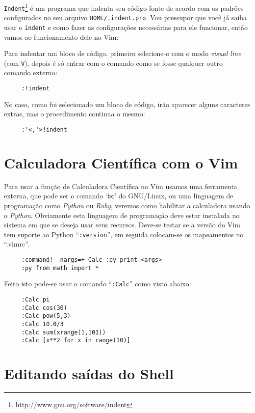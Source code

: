 {\tt Indent}\footnote{http://www.gnu.org/software/indent} 
é um programa que indenta seu código fonte de acordo com os padrões configurados
no seu arquivo {\tt HOME/.indent.pro}. Vou pressupor que você já saiba usar o {\tt indent}
e como fazer as configurações necessárias para ele funcionar, então vamos ao funcionamento 
dele no Vim:

Para indentar um bloco de código, primeiro selecione-o com o modo {\em visual line} (com {\tt V}), 
depois é só entrar com o comando como se fosse qualquer outro comando externo:
\begin{verbatim}
     :!indent
\end{verbatim}

No caso, como foi selecionado um bloco de código, irão aparecer alguns caracteres extras, 
mas o procedimento continua o mesmo:
\begin{verbatim}
     :'<,'>!indent
\end{verbatim}


\section{Calculadora Científica com o Vim}
\label{sec:Calculadora Científica com o Vim}

Para usar a função de Calculadora Científica no Vim usamos uma ferramenta
externa, que pode ser o comando `{\tt bc}' do GNU/Linux, ou uma linguagem de
programação como {\em Python} ou {\em Ruby}, veremos como habilitar a
calculadora usando o {\em Python}. Obviamente esta linguagem de programação
deve estar instalada no sistema em que se deseja usar seus recursos.  Deve-se
testar se a versão do Vim tem suporte ao Python ``\verb+:version+'', em seguida
colocam-se os mapeamentos no ``.vimrc''.

\begin{verbatim}
     :command! -nargs=+ Calc :py print <args>
     :py from math import *
\end{verbatim}

Feito isto pode-se usar o comando ``{\tt :Calc}'' como visto abaixo:

\begin{verbatim}
     :Calc pi
     :Calc cos(30)
     :Calc pow(5,3)
     :Calc 10.0/3
     :Calc sum(xrange(1,101))
     :Calc [x**2 for x in range(10)] 
\end{verbatim}

\section{Editando saídas do Shell}
\label{sec:Editando saídas do Shell}

